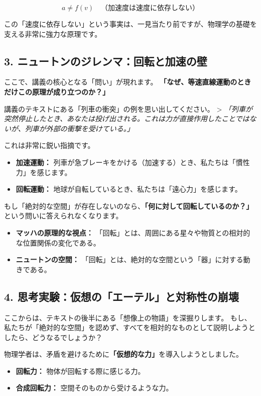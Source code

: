 \documentclass[a4paper,11pt,openany]{ltjsbook}
\begin{document}
\begin{lecturebox}
$$a \neq f(v) \quad \text{（加速度は速度に依存しない）}$$

この「速度に依存しない」という事実は、一見当たり前ですが、物理学の基礎を支える非常に強力な原理です。

\subsection*{3. ニュートンのジレンマ：回転と加速の壁}

ここで、講義の核心となる「問い」が現れます。
\textbf{「なぜ、等速直線運動のときだけこの原理が成り立つのか？」}

講義のテキストにある「列車の衝突」の例を思い出してください。
> \textit{「列車が突然停止したとき、あなたは投げ出される。これは力が直接作用したことではないが、列車が外部の衝撃を受けている。」}

これは非常に鋭い指摘です。
\begin{itemize}[leftmargin=2em]
\item \textbf{加速運動：} 列車が急ブレーキをかける（加速する）とき、私たちは「慣性力」を感じます。
\item \textbf{回転運動：} 地球が自転しているとき、私たちは「遠心力」を感じます。
\end{itemize}

もし「絶対的な空間」が存在しないのなら、\textbf{「何に対して回転しているのか？」}という問いに答えられなくなります。
\begin{itemize}[leftmargin=2em]
\item \textbf{マッハの原理的な視点：} 「回転」とは、周囲にある星々や物質との相対的な位置関係の変化である。
\item \textbf{ニュートンの空間：} 「回転」とは、絶対的な空間という「器」に対する動きである。
\end{itemize}

\subsection*{4. 思考実験：仮想の「エーテル」と対称性の崩壊}

ここからは、テキストの後半にある「想像上の物語」を深掘りします。
もし、私たちが「絶対的な空間」を認めず、すべてを相対的なものとして説明しようとしたら、どうなるでしょうか？

物理学者は、矛盾を避けるために\textbf{「仮想的な力」}を導入しようとしました。
\begin{itemize}[leftmargin=2em]
\item \textbf{回転力：} 物体が回転する際に感じる力。
\item \textbf{合成回転力：} 空間そのものから受けるような力。
\end{itemize}


\end{lecturebox}
\end{document}
